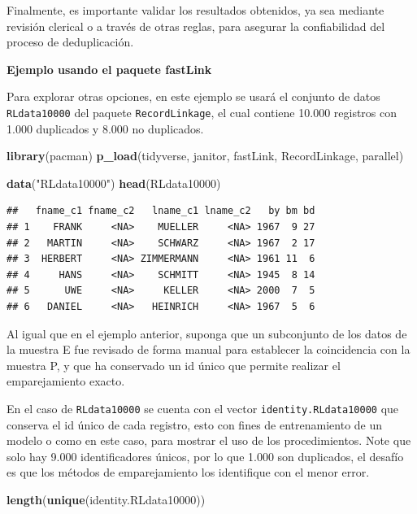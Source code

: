 \documentclass[
  12pt,
]{book}
\newenvironment{Shaded}{\begin{snugshade}}{\end{snugshade}}
\newcommand{\FunctionTok}[1]{\textcolor[rgb]{0.13,0.29,0.53}{\textbf{#1}}}
\newcommand{\NormalTok}[1]{#1}
\newcommand{\StringTok}[1]{\textcolor[rgb]{0.31,0.60,0.02}{#1}}
\begin{document}
Finalmente, es importante validar los resultados obtenidos, ya sea mediante revisión clerical o a través de otras reglas, para asegurar la confiabilidad del proceso de deduplicación.

\textbf{Ejemplo usando el paquete fastLink}

Para explorar otras opciones, en este ejemplo se usará el conjunto de datos \texttt{RLdata10000} del paquete \texttt{RecordLinkage}, el cual contiene 10.000 registros con 1.000 duplicados y 8.000 no duplicados.

\begin{Shaded}
\begin{Highlighting}[]
\FunctionTok{library}\NormalTok{(pacman)}
\FunctionTok{p\_load}\NormalTok{(tidyverse, janitor, fastLink, RecordLinkage, parallel)}

\FunctionTok{data}\NormalTok{(}\StringTok{"RLdata10000"}\NormalTok{)}
\FunctionTok{head}\NormalTok{(RLdata10000)}
\end{Highlighting}
\end{Shaded}

\begin{verbatim}
##   fname_c1 fname_c2   lname_c1 lname_c2   by bm bd
## 1    FRANK     <NA>    MUELLER     <NA> 1967  9 27
## 2   MARTIN     <NA>    SCHWARZ     <NA> 1967  2 17
## 3  HERBERT     <NA> ZIMMERMANN     <NA> 1961 11  6
## 4     HANS     <NA>    SCHMITT     <NA> 1945  8 14
## 5      UWE     <NA>     KELLER     <NA> 2000  7  5
## 6   DANIEL     <NA>   HEINRICH     <NA> 1967  5  6
\end{verbatim}

Al igual que en el ejemplo anterior, suponga que un subconjunto de los datos de la muestra E fue revisado de forma manual para establecer la coincidencia con la muestra P, y que ha conservado un id único que permite realizar el emparejamiento exacto.

En el caso de \texttt{RLdata10000} se cuenta con el vector \texttt{identity.RLdata10000} que conserva el id único de cada registro, esto con fines de entrenamiento de un modelo o como en este caso, para mostrar el uso de los procedimientos. Note que solo hay 9.000 identificadores únicos, por lo que 1.000 son duplicados, el desafío es que los métodos de emparejamiento los identifique con el menor error.

\begin{Shaded}
\begin{Highlighting}[]
\FunctionTok{length}\NormalTok{(}\FunctionTok{unique}\NormalTok{(identity.RLdata10000))}
\end{Highlighting}
\end{Shaded}
\end{document}
